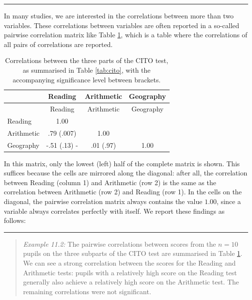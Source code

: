\documentclass[
]{book}
\begin{document}
\begin{center}\rule{0.5\linewidth}{0.5pt}\end{center}

In many studies, we are interested in the correlations between more
than two variables. These correlations between variables are often
reported in a so-called pairwise
correlation matrix like
Table \ref{tab:cito-correlations}, which is a table where the correlations
of all pairs of correlations are reported.

\begin{longtable}[]{@{}lccc@{}}
\caption{\label{tab:cito-correlations} Correlations between the three parts of the CITO
test, as summarised in Table \ref{tab:cito}, with the accompanying significance level between brackets.}\tabularnewline
\toprule\noalign{}
& Reading & Arithmetic & Geography \\
\midrule\noalign{}
\endfirsthead
\toprule\noalign{}
& Reading & Arithmetic & Geography \\
\midrule\noalign{}
\endhead
\bottomrule\noalign{}
\endlastfoot
Reading & 1.00 & & \\
Arithmetic & .79 (.007) & 1.00 & \\
Geography & -.51 (.13) - & .01 (.97) & 1.00 \\
\end{longtable}

In this matrix, only the lowest (left) half of the complete
matrix is shown. This suffices because the cells are mirrored
along the diagonal: after all, the correlation between Reading (column 1) and Arithmetic
(row 2) is the same as the correlation between Arithmetic (row 2) and
Reading (row 1). In the cells on the diagonal, the pairwise correlation matrix
always contains the value \(1.00\), since a variable always correlates perfectly with itself.
We report these findings as follows:

\begin{center}\rule{0.5\linewidth}{0.5pt}\end{center}

\begin{quote}
\emph{Example 11.2:} The
pairwise correlations between scores from the \(n=10\) pupils on the
three subparts of the CITO test are summarised in
Table \ref{tab:cito-correlations}. We can see a strong correlation between
the scores for the Reading and Arithmetic tests: pupils with a relatively
high score on the Reading test generally also achieve a relatively high
score on the Arithmetic test. The remaining correlations were
not significant.
\end{quote}
\end{document}
